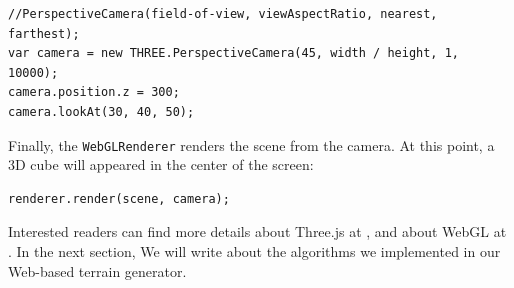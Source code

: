 \begin{lstlisting}
//PerspectiveCamera(field-of-view, viewAspectRatio, nearest, farthest);
var camera = new THREE.PerspectiveCamera(45, width / height, 1, 10000);
camera.position.z = 300;
camera.lookAt(30, 40, 50);
\end{lstlisting}

Finally, the \texttt{WebGLRenderer} renders the scene from the camera. At this point, a 3D cube will appeared in the center of the screen:

\begin{lstlisting}
renderer.render(scene, camera);
\end{lstlisting} 
  
Interested readers can find more details about Three.js at \cite{threeJS}, and about WebGL at \cite{wiki:webgl,learningWebGL}. In the next section, We will write about the algorithms we implemented in our Web-based terrain generator.

